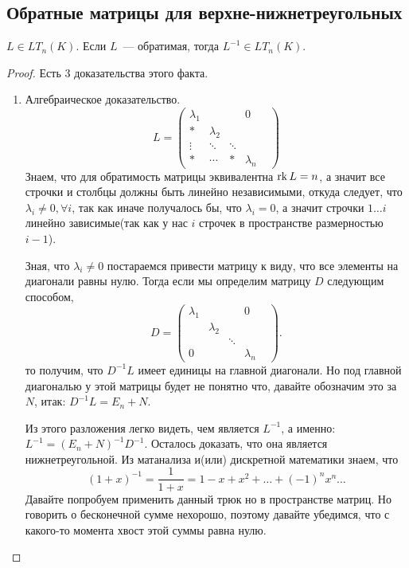 \subsection{Обратные матрицы для верхне-нижнетреугольных}
\begin{statement}
     $L\in LT_n(K)$. Если $L$~--- обратимая, тогда $L^{-1}\in LT_n(K)$.
\end{statement}
\begin{proof}
    Есть 3 доказательства этого факта.
    \begin{enumerate}
        \item Алгебраическое доказательство.\\
            $$L = 
            \begin{pmatrix}
                \lambda_1&&&0\\
                *&\lambda_2&&\\
                \vdots&\ddots&\ddots&&\\
                *&\cdots&*&\lambda_n
            \end{pmatrix}$$
            Знаем, что для обратимость матрицы эквивалентна $\operatorname{rk} L = n$, а значит все строчки и столбцы
            должны быть линейно независимыми, откуда следует, что $\lambda_i \not= 0, \forall i$, так как иначе
            получалось бы, что $\lambda_i = 0$, а значит строчки $1\dots i$ линейно зависимые(так как
            у нас $i$ строчек в пространстве размерностью $i - 1$).

            Зная, что $\lambda_i \not= 0$ постараемся привести матрицу к виду, что все элементы на диагонали 
            равны нулю.
            Тогда если мы определим матрицу $D$ следующим способом,
            \[
            D = \begin{pmatrix}
                \lambda_1&&&0\\
                &\lambda_2&&\\
                &&\ddots&&\\
                0&&&\lambda_n
            \end{pmatrix}
            .\] 
            то получим, что $D^{-1} L$ имеет единицы на главной диагонали. Но под главной диагональю у этой матрицы будет
            не понятно что, давайте обозначим это за $N$, итак: $D^{-1}L = E_n + N$.

            Из этого разложения легко видеть, чем является $L^{-1}$, а именно: $L^{-1} = (E_n + N)^{-1}D^{-1}$.
            Осталось доказать, что она является нижнетреугольной.
            Из матанализа и(или) дискретной математики знаем, что 
            \[
                (1 + x)^{-1} = \frac{1}{1+x} = 1 - x + x^2 +\dots +(-1)^nx^n\dots
            \]
            Давайте попробуем применить данный трюк но в пространстве матриц.
            Но говорить о бесконечной сумме нехорошо, поэтому давайте убедимся,
            что с какого-то момента хвост этой суммы равна нулю.


\end{enumerate}
\end{proof}
